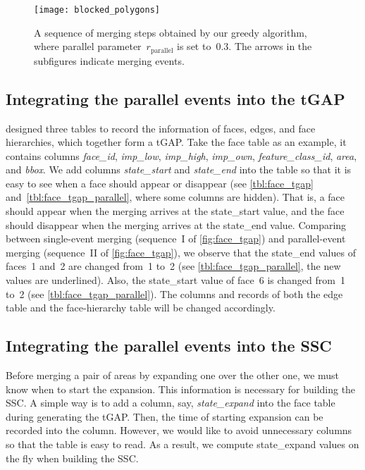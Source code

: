 \documentclass[ijgi,article,submit,moreauthors,pdftex]{Definitions/mdpi}
\begin{document}
\begin{figure}[tb]
\centering
\texttt{[image: blocked\_polygons]}
\caption{A sequence of merging steps obtained by our greedy algorithm,
	where parallel parameter~$r_\mathrm{parallel}$ is set to~$0.3$.
	The arrows in the subfigures indicate merging events.
}
\label{fig:sequence_greedy}
\end{figure}




\subsection{Integrating the parallel events into the tGAP}

\citet[]{Meijers2011Thesis} designed three tables 
to record the information of
faces, edges, and face hierarchies, 
which together form a tGAP.
Take the face table as an example,
it contains columns \emph{face\_id}, 
\emph{imp\_low}, \emph{imp\_high}, \emph{imp\_own},
\emph{feature\_class\_id}, \emph{area}, and \emph{bbox}.
We add columns \emph{state\_start} and \emph{state\_end} into the table 
so that it is easy to see when a face should appear or disappear 
(see \tbls\ref{tbl:face_tgap} and~\ref{tbl:face_tgap_parallel},
where some columns are hidden).
That is, a face should appear
when the merging arrives at the state\_start value,
and the face should disappear
when the merging arrives at the state\_end value.
Comparing between single-event merging 
(sequence~I of \fig\ref{fig:face_tgap})
and parallel-event merging (sequence~II of \fig\ref{fig:face_tgap}),
we observe that the state\_end values of faces~1 and~2 are changed from~1 to~2
(see \tbl\ref{tbl:face_tgap_parallel}, the new values are underlined).
Also, the state\_start value of face~6 is changed from~1 to~2
(see \tbl\ref{tbl:face_tgap_parallel}).
The columns and records of both the edge table and the face-hierarchy table 
will be changed accordingly.


\subsection{Integrating the parallel events into the SSC}

Before merging a pair of areas by expanding one over the other one,
we must know when to start the expansion.
This information is necessary for building the SSC.
A simple way is to add a column, say, \emph{state\_expand} 
into the face table during generating the tGAP.
Then, the time of starting expansion can be recorded into the column.
However, we would like to avoid unnecessary columns
so that the table is easy to read.
As a result, we compute state\_expand values on the fly 
when building the SSC.
\end{document}
